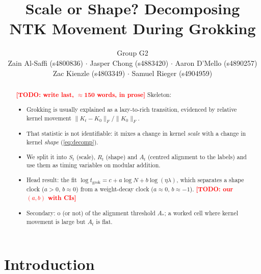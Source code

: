 \documentclass[a4paper,11pt]{article} %
\newcommand{\TODO}[1]{\textcolor{red}{\textbf{[TODO: #1]}}}
\newcommand{\Fnorm}[1]{\lVert #1 \rVert_F}
\newcommand{\tgrok}{t_{\mathrm{grok}}}
\newcommand{\Astar}{A_{*}}
\begin{document}
\title{Scale or Shape? Decomposing NTK Movement During Grokking}
\author{Group G2 \\
Zain Al-Saffi (s4800836) $\cdot$
Jasper Chong (s4883420) $\cdot$
Aaron D'Mello (s4890257) \\
Zac Kienzle (s4803349) $\cdot$ Samuel Rieger (s4904959)}

\date{}
\maketitle


\begin{abstract}
	\TODO{write last, $\approx$150 words, in prose}
	Skeleton:
	\begin{itemize}
		\item Grokking is usually explained as a lazy-to-rich transition, evidenced
			by relative kernel movement $\Fnorm{K_t-K_0}/\Fnorm{K_0}$.
		\item That statistic is not identifiable: it mixes a change in kernel
			\emph{scale} with a change in kernel \emph{shape} (\cref{eq:decomp}).
		\item We split it into $S_t$ (scale), $R_t$ (shape) and $A_t$ (centred
			alignment to the labels) and use them as timing variables on modular
			addition.
		\item Head result: the fit $\log\tgrok = c + a\log N + b\log(\eta\lambda)$,
			which separates a shape clock ($a>0$, $b\approx0$) from a weight-decay
			clock ($a\approx0$, $b\approx-1$). \TODO{our $(a,b)$ with CIs}
		\item Secondary: o (or not) of the alignment threshold $\Astar$;
			a worked cell where kernel movement is large but $A_t$ is flat.
	\end{itemize}
\end{abstract}

\section{Introduction}
\end{document}
